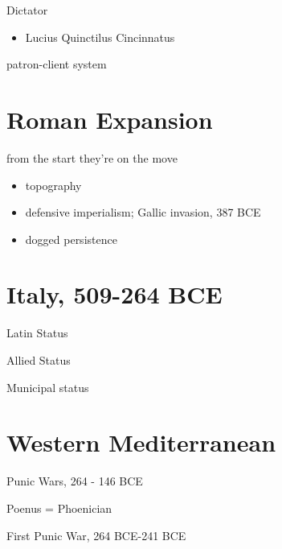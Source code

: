 \documentclass[11pt, a4paper]{article}
\begin{document}
Dictator
\begin{itemize}
  \item Lucius Quinctilus Cincinnatus
\end{itemize}

patron-client system

\section{Roman Expansion}
from the start they're on the move
\begin{itemize}
  \item topography
  \item defensive imperialism; Gallic invasion, 387 BCE
  \item dogged persistence
\end{itemize}

\section{Italy, 509-264 BCE}
Latin Status

Allied Status

Municipal status

\section{Western Mediterranean}
Punic Wars, 264 - 146 BCE

Poenus = Phoenician

First Punic War, 264 BCE-241 BCE
\end{document}
